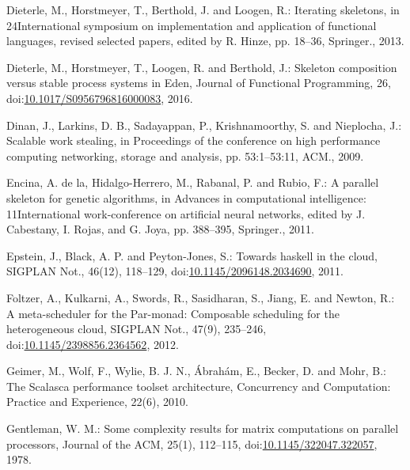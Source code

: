 \documentclass[paper=A4,twoside=true,openright,parskip=full,chapterprefix=true,headings=normal,bibliography=totoc,listof=totoc,titlepage=on,captions=tableabove,draft=false,british]{scrreprt}%
\begin{document}
\leavevmode\hypertarget{ref-Dieterle2013}{}%
Dieterle, M., Horstmeyer, T., Berthold, J. and Loogen, R.: Iterating
skeletons, in 24International symposium on implementation and
application of functional languages, revised selected papers, edited by
R. Hinze, pp. 18--36, Springer., 2013.

\leavevmode\hypertarget{ref-dieterle_horstmeyer_loogen_berthold_2016}{}%
Dieterle, M., Horstmeyer, T., Loogen, R. and Berthold, J.: Skeleton
composition versus stable process systems in Eden, Journal of Functional
Programming, 26,
doi:\href{https://doi.org/10.1017/S0956796816000083}{10.1017/S0956796816000083},
2016.

\leavevmode\hypertarget{ref-Dinan:2009:SWS:1654059.1654113}{}%
Dinan, J., Larkins, D. B., Sadayappan, P., Krishnamoorthy, S. and
Nieplocha, J.: Scalable work stealing, in Proceedings of the conference
on high performance computing networking, storage and analysis, pp.
53:1--53:11, ACM., 2009.

\leavevmode\hypertarget{ref-delaEncina2011}{}%
Encina, A. de la, Hidalgo-Herrero, M., Rabanal, P. and Rubio, F.: A
parallel skeleton for genetic algorithms, in Advances in computational
intelligence: 11International work-conference on artificial neural
networks, edited by J. Cabestany, I. Rojas, and G. Joya, pp. 388--395,
Springer., 2011.

\leavevmode\hypertarget{ref-Epstein:2011:THC:2096148.2034690}{}%
Epstein, J., Black, A. P. and Peyton-Jones, S.: Towards haskell in the
cloud, SIGPLAN Not., 46(12), 118--129,
doi:\href{https://doi.org/10.1145/2096148.2034690}{10.1145/2096148.2034690},
2011.

\leavevmode\hypertarget{ref-Foltzer:2012:MPC:2398856.2364562}{}%
Foltzer, A., Kulkarni, A., Swords, R., Sasidharan, S., Jiang, E. and
Newton, R.: A meta-scheduler for the Par-monad: Composable scheduling
for the heterogeneous cloud, SIGPLAN Not., 47(9), 235--246,
doi:\href{https://doi.org/10.1145/2398856.2364562}{10.1145/2398856.2364562},
2012.

\leavevmode\hypertarget{ref-Geimer2010}{}%
Geimer, M., Wolf, F., Wylie, B. J. N., Ábrahám, E., Becker, D. and Mohr,
B.: The Scalasca performance toolset architecture, Concurrency and
Computation: Practice and Experience, 22(6), 2010.

\leavevmode\hypertarget{ref-Gentleman1978}{}%
Gentleman, W. M.: Some complexity results for matrix computations on
parallel processors, Journal of the ACM, 25(1), 112--115,
doi:\href{https://doi.org/10.1145/322047.322057}{10.1145/322047.322057},
1978.
\end{document}
